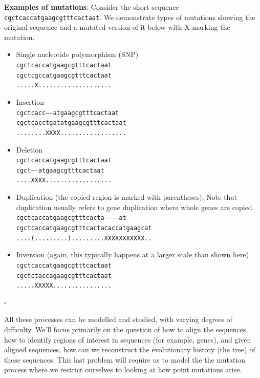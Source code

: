 \documentclass[11pt]{article}
\newcommand{\sqend}{\hfill $\square$}
\begin{document}
{\bf Examples of mutations}: Consider the short sequence 
{\tt cgctcaccatgaagcgtttcactaat}.  We demonstrate types of mutations showing the original sequence and a mutated version of it below with X marking the mutation.
\begin{itemize}
\item Single nucleotide polymorphism (SNP) \\
{\tt cgctcaccatgaagcgtttcactaat}\\
{\tt cgctcgccatgaagcgtttcactaat}\\
{\tt .....X....................}
\item Insertion \\
{\tt cgctcacc----atgaagcgtttcactaat}\\
{\tt cgctcacctgatatgaagcgtttcactaat}\\
{\tt ........XXXX..................}
\item Deletion \\
{\tt cgctcaccatgaagcgtttcactaat}\\
{\tt cgct----atgaagcgtttcactaat}\\
{\tt ....XXXX..................}
\item Duplication (the copied region is marked with parentheses).  Note that duplication usually refers to gene duplication where whole genes are copied. \\
{\tt cgctcaccatgaagcgtttcacta-----------at}\\
{\tt cgctcaccatgaagcgtttcactacaccatgaagcat}\\
{\tt ....(.........).........XXXXXXXXXXX..}
\item Inversion (again, this typically happens at a larger scale than shown here) \\
{\tt cgctcaccatgaagcgtttcactaat}\\
{\tt cgctctaccagaagcgtttcactaat}\\
{\tt .....XXXXX................}

\end{itemize} \sqend

 

All these processes can be modelled and studied, with varying degrees of difficulty.  We'll focus primarily on the question of how to align the sequences, how to identify regions of interest in sequences (for example, genes), and given aligned sequences, how can we reconstruct the evolutionary history (the tree) of those sequences.  This last problem will require us to model the the mutation process where we restrict ourselves to looking at how point mutations arise.
\end{document}
